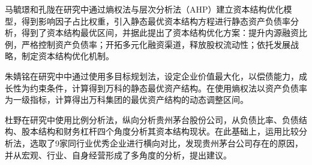 马毓璟和孔陇在研究中通过熵权法与层次分析法（AHP）建立资本结构优化模型，得到影响因子占比权重，引入静态最优资本结构方程进行静态资产负债率分析，得到了资本结构最优区间，并据此提出了资本结构优化方案：提升内源融资比例，严格控制资产负债率；开拓多元化融资渠道，释放股权流动性；依托发展战略，制定资本结构优化机制。\cite{Ma2022}

朱婧铭在研究中中通过使用多目标规划法，设定企业价值最大化，以偿债能力，成长性为约束条件，计算得到万科的静态最优资产结构。在使用熵权法以资产负债率为一级指标，计算得出万科集团的最优资产结构的动态调整区间。\cite{Zhu2023}

杜野在研究中使用比例分析法，纵向分析贵州茅台股份公司，从负债比率、负债结构、股本结构和财务杠杆四个角度分析其资本结构现状。在此基础上，运用比较分析法，选取了9家同行业优秀企业进行横向对比，发现贵州茅台公司存在的原因，并从宏观、行业、自身经营形成了多角度的分析，提出建议。\cite{Du2016}

